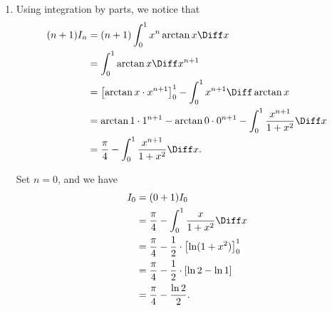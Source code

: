 \Question{\currfilebase}

\begin{enumerate}
    \item Using integration by parts, we notice that
          \begin{align*}
              (n + 1) I_n & = (n + 1) \int_{0}^{1} x^n \arctan x \Diff x                                                             \\
                          & = \int_{0}^{1} \arctan x \Diff x^{n + 1}                                                                 \\
                          & = \left[\arctan x \cdot x^{n + 1}\right]_{0}^{1} - \int_{0}^{1} x^{n + 1} \Diff \arctan x                \\
                          & = \arctan 1 \cdot 1^{n + 1} - \arctan 0 \cdot 0^{n + 1} - \int_{0}^{1} \frac{x^{n + 1}}{1 + x^2} \Diff x \\
                          & = \frac{\pi}{4} - \int_{0}^{1} \frac{x^{n + 1}}{1 + x^2} \Diff x.
          \end{align*}

          Set \(n = 0\), and we have
          \begin{align*}
              I_0 & = (0 + 1) I_0                                                         \\
                  & = \frac{\pi}{4} - \int_{0}^{1} \frac{x}{1 + x^2} \Diff x              \\
                  & = \frac{\pi}{4} - \frac{1}{2} \cdot \left[\ln(1 + x^2)\right]_{0}^{1} \\
                  & = \frac{\pi}{4} - \frac{1}{2} \cdot \left[\ln 2 - \ln 1\right]        \\
                  & = \frac{\pi}{4} - \frac{\ln 2}{2}.
          \end{align*}


\end{enumerate}
